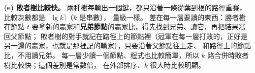 \begin{pastsoln}
\textbf{(e) 敗者樹比較快。} 兩種樹每輸出一個鍵，都只沿著一條從葉到根的路徑重賽，比較次數都是 $\lceil \lg k \rceil$（$k$ 是串數），
量級一樣。 差在每一層要讀的東西：勝者樹在節點 $t$ 要拿新的贏家和\textbf{兄弟節點}的贏家比，得先找到兄弟、讀它，再把結果寫回父節點；
敗者樹的對手就記在路徑上的節點裡（冠軍在每一層打敗的，正好是另一邊的贏家，也就是那裡記的輸家），只要沿著父節點往上走、
和路徑上的節點比，不用讀兄弟。 每一層少讀一個節點、程式也比較簡單，所以 $k$ 路合併時敗者樹比較快；這個差別是常數倍，
在外部排序、$k$ 很大時比較明顯。
\end{pastsoln}

